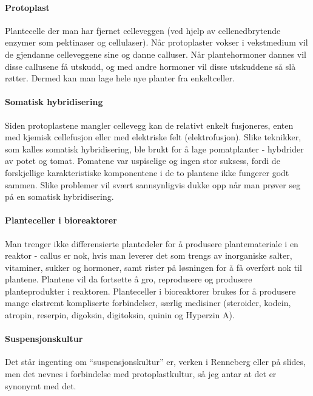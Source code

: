 \paragraph{Protoplast} Plantecelle der man har fjernet celleveggen (ved hjelp av cellenedbrytende enzymer som pektinaser og cellulaser). Når protoplaster vokser i vekstmedium vil de gjendanne celleveggene sine og danne calluser. Når plantehormoner dannes vil disse callusene få utskudd, og med andre hormoner vil disse utskuddene så slå røtter. Dermed kan man lage hele nye planter fra enkeltceller.

\paragraph{Somatisk hybridisering} Siden protoplastene mangler cellevegg kan de relativt enkelt fusjoneres, enten med kjemisk cellefusjon eller med elektriske felt (elektrofusjon). Slike teknikker, som kalles somatisk hybridisering, ble brukt for å lage pomatplanter - hybdrider av potet og tomat. Pomatene var uspiselige og ingen stor suksess, fordi de forskjellige karakteristiske komponentene i de to plantene ikke fungerer godt sammen. Slike problemer vil svært sannsynligvis dukke opp når man prøver seg på en somatisk hybridisering.

\paragraph{Planteceller i bioreaktorer} Man trenger ikke differensierte plantedeler for å produsere plantemateriale i en reaktor - callus er nok, hvis man leverer det som trengs av inorganiske salter, vitaminer, sukker og hormoner, samt rister på løsningen for å få overført nok  til plantene. Plantene vil da fortsette å gro, reprodusere og produsere planteprodukter i reaktoren. Planteceller i bioreaktorer brukes for å produsere mange ekstremt kompliserte forbindelser, særlig medisiner (steroider, kodein, atropin, reserpin, digoksin, digitoksin, quinin og Hyperzin A).

\paragraph{Suspensjonskultur} Det står ingenting om ``suspensjonskultur'' er, verken i Renneberg eller på slides, men det nevnes i forbindelse med protoplastkultur, så jeg antar at det er synonymt med det.

